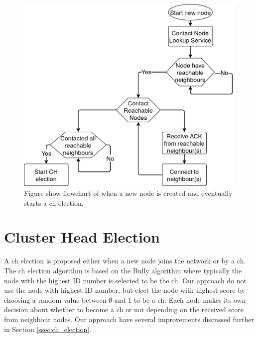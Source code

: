 \documentclass[USenglish]{uit-thesis}
\begin{document}
\begin{figure}
\centering
\includegraphics[scale=0.28]{newNodeChart2.png}
\caption{Figure show flowchart of when a new node is created and eventually starts a \gls{ch} election.}
\label{fig:newNodeChart2}
\end{figure}



\section{Cluster Head Election} \label{imp:ch_election}


A \gls{ch} election is proposed either when a new node joins the network or by a \gls{ch}. 
The \gls{ch} election algorithm is based on the Bully algorithm \cite{bully} where typically the node with the highest ID number is selected to be the \gls{ch}. Our approach do not use the node with highest ID number, but elect the node with highest score by choosing a random value between $\emptyset$ and 1 to be a \gls{ch}. Each node makes its own decision about whether to become a \gls{ch} or not depending on the received score from neighbour nodes.
Our approach have several improvements discussed further in Section \ref{ssec:ch_election}. 
\end{document}

